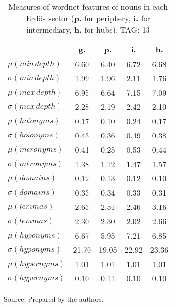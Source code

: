 \begin{table}[h!]
\begin{center}
	\caption{Measures of wordnet features of nouns in each Erd\"os sector ({{\bf p.}} for periphery, {{\bf i.}} for intermediary, {{\bf h.}} for hubs). TAG: 13}\label{tab:wnn}
\begin{tabular}{| l || c | c | c | c |}\hline
 & {\bf g.} & {\bf p.} & {\bf i.} & {\bf h.} \\\hline\hline
$\mu(min\,depth)$ & 6.60  & 6.40  & 6.72  & 6.68 \\
$\sigma(min\,depth)$ & 1.99  & 1.96  & 2.11  & 1.76 \\\hline
$\mu(max\,depth)$ & 6.95  & 6.64  & 7.15  & 7.09 \\
$\sigma(max\,depth)$ & 2.28  & 2.19  & 2.42  & 2.10 \\\hline
$\mu(holonyms)$ & 0.17  & 0.10  & 0.24  & 0.17 \\
$\sigma(holonyms)$ & 0.43  & 0.36  & 0.49  & 0.38 \\\hline
$\mu(meronyms)$ & 0.41  & 0.25  & 0.53  & 0.44 \\
$\sigma(meronyms)$ & 1.38  & 1.12  & 1.47  & 1.57 \\\hline
$\mu(domains)$ & 0.12  & 0.13  & 0.12  & 0.10 \\
$\sigma(domains)$ & 0.33  & 0.34  & 0.33  & 0.31 \\\hline
$\mu(lemmas)$ & 2.63  & 2.51  & 2.46  & 3.16 \\
$\sigma(lemmas)$ & 2.30  & 2.30  & 2.02  & 2.66 \\\hline
$\mu(hyponyms)$ & 6.67  & 5.95  & 7.21  & 6.85 \\
$\sigma(hyponyms)$ & 21.70  & 19.05  & 22.92  & 23.36 \\\hline
$\mu(hypernyms)$ & 1.01  & 1.01  & 1.01  & 1.01 \\
$\sigma(hypernyms)$ & 0.10  & 0.11  & 0.10  & 0.10 \\\hline
\end{tabular}
\begin{flushleft}
		Source: Prepared by the authors.\
\end{flushleft}
\end{center}
\end{table}
